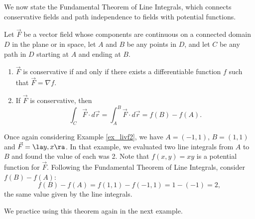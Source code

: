 We now state the Fundamental Theorem of Line Integrals, which connects conservative fields and path independence to fields with potential functions. 

{Let $\vec F$ be a vector field whose components are continuous on a connected domain $D$ in the plane or in space, let $A$ and $B$ be any points in $D$, and let $C$ be any path in $D$ starting at $A$ and ending at $B$.
\begin{enumerate}
	\item $\vec F$ is conservative if and only if there exists a differentiable function $f$ such that $\vec F = \nabla f$. 
	\item	If $\vec F$ is conservative, then 
	$$\int_C\vec F\cdot d\vec r = \int_A^B \vec F\cdot d\vec r = f(B) - f(A).$$
\end{enumerate}
}

Once again considering Example \ref{ex_livf2}, we have $A = (-1,1)$, $B = (1,1)$ and $\vec F = \la y,x\ra$. In that example, we evaluated two line integrals from $A$ to $B$ and found the value of each was 2. Note that $f(x,y) = xy$ is a potential function for $\vec F$. Following the Fundamental Theorem of Line Integrals, consider $f(B) - f(A)$:
$$f(B) - f(A) = f(1,1) - f(-1,1) = 1 - (-1) = 2,$$
the same value given by the line integrals.

\enlargethispage{\baselineskip}
We practice using this theorem again in the next example.\\

